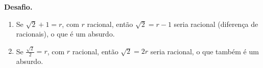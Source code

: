 \documentclass[11pt,a4paper]{article}
\begin{document}
\noindent\textbf{Desafio.}
\begin{enumerate}[label=\alph*), leftmargin=*]
  \item Se $\sqrt{2} + 1 = r$, com $r$ racional, então
        $\sqrt{2} = r - 1$ seria racional (diferença de racionais), o que é um absurdo.
  \item Se $\frac{\sqrt{2}}{2} = r$, com $r$ racional, então $\sqrt{2} = 2r$
        seria racional, o que também é um absurdo.

\end{enumerate}
\end{document}
